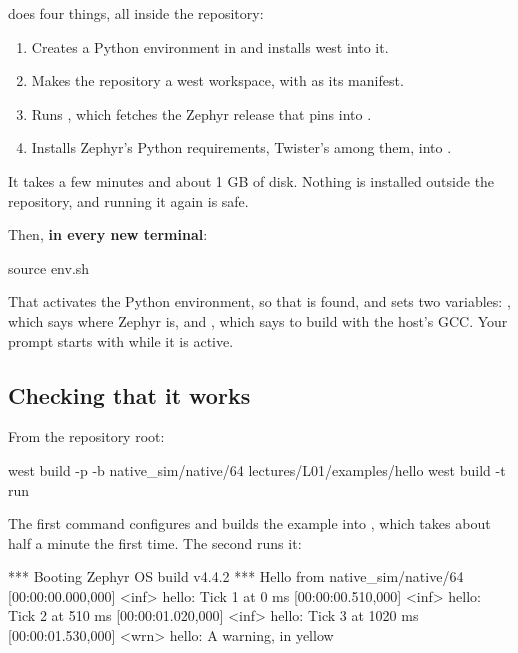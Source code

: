\noindent {} does four things, all inside the repository:

\begin{enumerate}
  \item Creates a Python environment in  and installs west into it.
  \item Makes the repository a west workspace, with  as its manifest.
  \item Runs , which fetches the Zephyr release that  pins into
    .
  \item Installs Zephyr’s Python requirements, Twister’s among them, into .
\end{enumerate}

It takes a few minutes and about 1 GB of disk. Nothing is installed outside the repository, and
running it again is safe.

Then, \textbf{in every new terminal}:

\begin{shell}
source env.sh
\end{shell}

\noindent That activates the Python environment, so that  is found, and sets two
variables: , which says where Zephyr is, and ,
which says to build with the host’s GCC. Your prompt starts with  while it is active.

\subsection{Checking that it works}
From the repository root:

\begin{shell}
west build -p -b native_sim/native/64 lectures/L01/examples/hello
west build -t run
\end{shell}

\noindent The first command configures and builds the example into , which takes about
half a minute the first time. The second runs it:

\begin{console}
*** Booting Zephyr OS build v4.4.2 ***
Hello from native_sim/native/64
[00:00:00.000,000] <inf> hello: Tick 1 at 0 ms
[00:00:00.510,000] <inf> hello: Tick 2 at 510 ms
[00:00:01.020,000] <inf> hello: Tick 3 at 1020 ms
[00:00:01.530,000] <wrn> hello: A warning, in yellow
\end{console}

